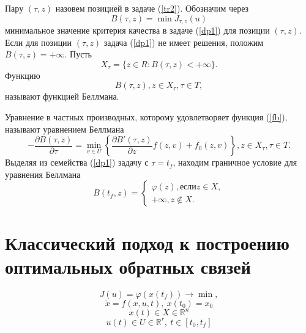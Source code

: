 Пару $(\tau , z)$ назовем позицией в задаче (\ref{tr2}). Обозначим через $$B(\tau ,z) = \min J_{\tau ,z} (u)$$
минимальное значение критерия качества в задаче (\ref{dp1}) для позиции $(\tau , z)$. Если для позиции  $(\tau , z)$ задача (\ref{dp1}) не имеет решения, положим $B(\tau ,z) =  +\infty$. Пусть $$X_{\tau } = \{z \in R : B(\tau ,z) < +\infty \}.$$
Функцию\begin{equation}\label{fb} B(\tau ,z), z \in X_{\tau}, \tau \in T,\end{equation} называют функцией Беллмана.

Уравнение в частных производных, которому удовлетворяет функция (\ref{fb}), называют уравнением Беллмана
\begin{equation}\label{ub} -\frac{\partial B(\tau,z)}{\partial\tau} = \min_{v \in U}\left\{ \frac{\partial B'(\tau,z)}{\partial z}f(z,v) + f_0(z,v)\right\}, z \in X_\tau, \tau \in T.\end{equation}
Выделяя из семейства (\ref{dp1}) задачу с $\tau = t_f$, находим граничное условие для уравнения Беллмана
\begin{equation}\label{gusl}B(t_f,z)=\begin{cases}
\varphi(z), если z \in X, \\
+\infty , z \not\in X.
\end{cases}\end{equation}
\bigskip


\section{Классический подход к построению оптимальных обратных связей}\label{1sec:MPC}

\begin{equation} \label{1problem}
    J(u) = \varphi(x(t_f))\to \min,
    \end{equation}
\begin{equation} \label{2problem}
    \dot{x}=f(x,u,t),\ x(t_0)=x_0
     \end{equation}
\begin{equation} \label{3problem}
  	x(t)\in X\in\mathbb{R}^n
     \end{equation}
\begin{equation} \label{4problem}
  	 u(t)\in U\in\mathbb{R}^r,\  t\in [t_0, t_f]
     \end{equation} 



